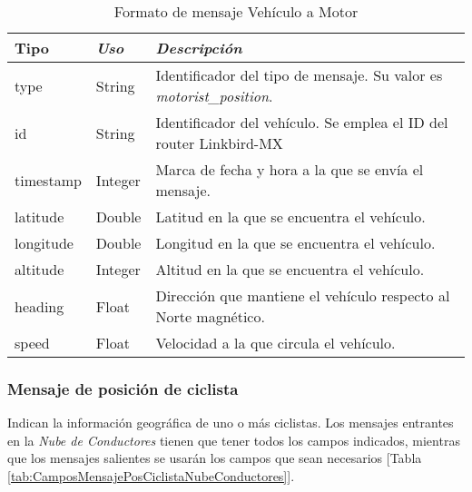 \begin{table}[H]
	\centering
	\caption{Formato de mensaje Vehículo a Motor}\label{tab:CamposMensajePosVehMotNubeConductores}
	\begin{tabular}{lll}
		\toprule
			\textbf{Tipo} & \emph{Uso} & \emph{Descripción}\\
		\midrule
			type		&	String	&	Identificador del tipo de mensaje. Su valor es \emph{motorist\_position}.	\\
			id		&	String	&	Identificador del vehículo. Se emplea el ID del router Linkbird-MX		\\
			timestamp	&	Integer	&	Marca de fecha y hora a la que se envía el mensaje.					\\
			latitude	&	Double	&	Latitud en la que se encuentra el vehículo. 						\\
			longitude	&	Double	&	Longitud en la que se encuentra el vehículo.						\\
			altitude	&	Integer	&	Altitud en la que se encuentra el vehículo.						\\
			heading	&	Float		&	Dirección que mantiene el vehículo respecto al Norte magnético.		\\
			speed	&	Float		&	Velocidad a la que circula el vehículo.							\\
		\bottomrule
	\end{tabular}
\end{table}

\subsubsection{Mensaje de posición de ciclista}\label{sssection:MensajePosCiclista}
Indican la información geográfica de uno o más ciclistas. Los mensajes entrantes
en la \emph{Nube de Conductores} tienen que tener todos los campos indicados, mientras
que los mensajes salientes se usarán los campos que sean necesarios [Tabla 
\ref{tab:CamposMensajePosCiclistaNubeConductores}].

